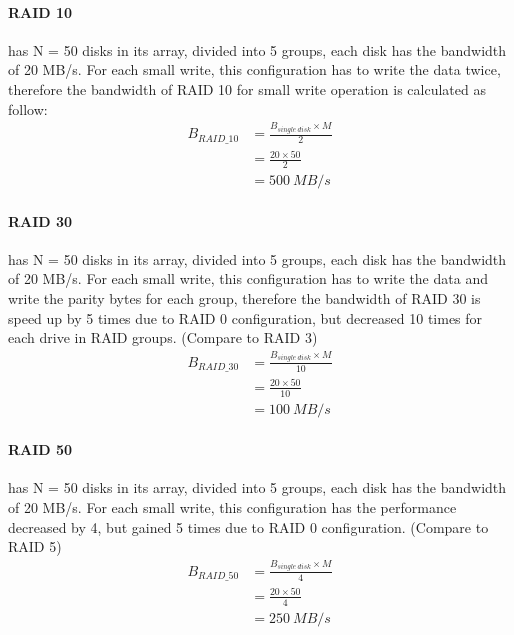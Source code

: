 \documentclass[a4paper,11pt]{article}
\begin{document}
\paragraph{RAID 10} has N = 50 disks in its array, divided into 5 groups, each disk has the bandwidth of 20 MB/s. For each small write, this configuration has to write the data twice, therefore the bandwidth of RAID 10 for small write operation is calculated as follow:
\begin{equation*}
    \begin{aligned}
        B_{RAID\_10} &= \frac{B_{single\ disk} \times M}{2} \\
        & = \frac{20 \times 50}{2} \\
        & = 500\ MB/s 
    \end{aligned}
\end{equation*}

\paragraph{RAID 30} has N = 50 disks in its array, divided into 5 groups, each disk has the bandwidth of 20 MB/s. For each small write, this configuration has to write the data and write the parity bytes for each group, therefore the bandwidth of RAID 30 is speed up by 5 times due to RAID 0 configuration, but decreased 10 times for each drive in RAID groups. (Compare to RAID 3)
\begin{equation*}
    \begin{aligned}
        B_{RAID\_30} &= \frac{B_{single\ disk} \times M }{10} \\
        & = \frac{20 \times 50}{10} \\
        & = 100\ MB/s 
    \end{aligned}
\end{equation*}

\paragraph{RAID 50} has N = 50 disks in its array, divided into 5 groups, each disk has the bandwidth of 20 MB/s. For each small write, this configuration has the performance decreased by 4, but gained 5 times due to RAID 0 configuration. (Compare to RAID 5)
\begin{equation*}
    \begin{aligned}
        B_{RAID\_50} &= \frac{B_{single\ disk} \times M }{4} \\
        & = \frac{20 \times 50}{4} \\
        & = 250\ MB/s 
    \end{aligned}
\end{equation*}
\end{document}
